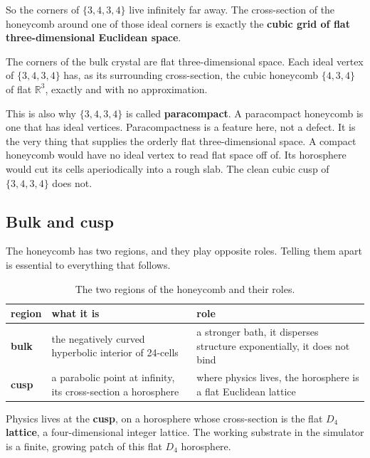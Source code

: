 So the corners of $\{3,4,3,4\}$ live infinitely far away. The cross-section of the honeycomb around one of those ideal corners is exactly the \textbf{cubic grid of flat three-dimensional Euclidean space}.

\begin{result}
The corners of the bulk crystal are flat three-dimensional space. Each ideal vertex of $\{3,4,3,4\}$ has, as its surrounding cross-section, the cubic honeycomb $\{4,3,4\}$ of flat $\mathbb{R}^3$, exactly and with no approximation.
\end{result}

This is also why $\{3,4,3,4\}$ is called \textbf{paracompact}. A paracompact honeycomb is one that has ideal vertices. Paracompactness is a feature here, not a defect. It is the very thing that supplies the orderly flat three-dimensional space. A compact honeycomb would have no ideal vertex to read flat space off of. Its horosphere would cut its cells aperiodically into a rough slab. The clean cubic cusp of $\{3,4,3,4\}$ does not.

\subsection{Bulk and cusp}

The honeycomb has two regions, and they play opposite roles. Telling them apart is essential to everything that follows.

\begin{table}[ht]
\centering
\begin{tabular}{@{}p{}p{}p{}@{}}
\toprule
region & what it is & role \\
\midrule
\textbf{bulk} & the negatively curved hyperbolic interior of 24-cells & a stronger bath, it disperses structure exponentially, it does not bind \\
\textbf{cusp} & a parabolic point at infinity, its cross-section a horosphere & where physics lives, the horosphere is a flat Euclidean lattice \\
\bottomrule
\end{tabular}
\caption{The two regions of the honeycomb and their roles.}
\label{tab:bulk-cusp}
\end{table}

Physics lives at the \textbf{cusp}, on a horosphere whose cross-section is the flat \textbf{$D_4$ lattice}, a four-dimensional integer lattice. The working substrate in the simulator is a finite, growing patch of this flat $D_4$ horosphere.

